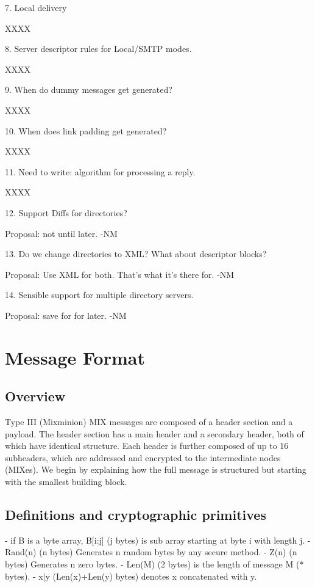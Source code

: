 7. Local delivery

   XXXX

8. Server descriptor rules for Local/SMTP modes.

   XXXX

9. When do dummy messages get generated?

   XXXX

10. When does link padding get generated?

   XXXX

11. Need to write: algorithm for processing a reply.

   XXXX

12. Support Diffs for directories?

    Proposal: not until later. -NM

13. Do we change directories to XML?  What about descriptor blocks?

    Proposal: Use XML for both. That's what it's there for. -NM

14. Sensible support for multiple directory servers.

    Proposal: save for for later. -NM

\section{Message Format}


\subsection{Overview}

Type III (Mixminion) MIX messages are composed of a header section and a
payload.  The header section has a main header and a
secondary header, both of which have identical structure.  Each
header is further composed of up to 16 subheaders, which are
addressed and encrypted to the intermediate nodes (MIXes).  We
begin by explaining how the full message is structured but starting
with the smallest building block.

\subsection{Definitions and cryptographic primitives}

- if B is a byte array, B[i:j] (j bytes) is sub array starting at 
  byte i with length j.
- Rand(n) (n bytes) Generates n random bytes by any secure method.
- Z(n) (n bytes) Generates n zero bytes.
- Len(M) (2 bytes) is the length of message M (* bytes).
- x|y (Len(x)+Len(y) bytes) denotes x concatenated with y.

